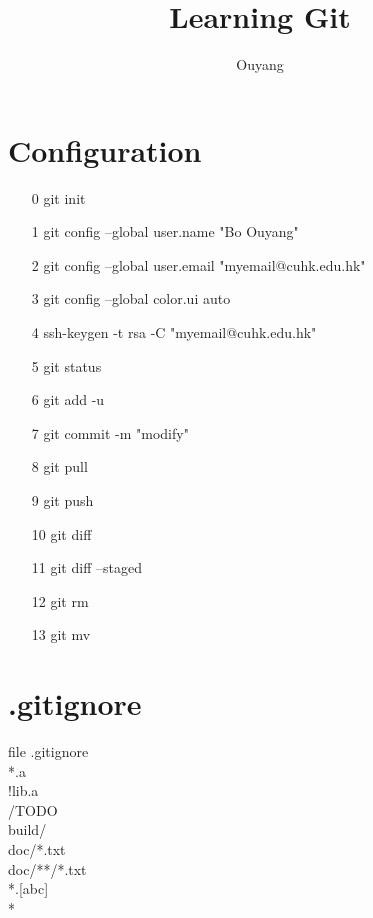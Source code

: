 \documentclass[10pt,a4paper]{article}
\author{Ouyang}
\title{Learning Git}
\begin{document}
	\maketitle
	\section{Configuration}
	\begin{itemize}
		\item[0] git init
		\item[1] git config --global user.name "Bo Ouyang"
		\item[2] git config --global user.email "myemail@cuhk.edu.hk"
		\item[3] git config --global color.ui auto
		\item[4] ssh-keygen -t rsa -C "myemail@cuhk.edu.hk"
		\item[5] git status
		\item[6] git add -u
		\item[7] git commit -m "modify"
		\item[8] git pull
		\item[9] git push
		\item[10] git diff
		\item[11] git diff --staged
		\item[12] git rm
		\item[13] git mv
	\end{itemize}
	\section{.gitignore}
    	file .gitignore\\
		*.a\\
		!lib.a\\
		/TODO\\
		build/\\
		doc/*.txt\\
		doc/**/*.txt\\
		*.[abc]\\
		*~\\
\end{document}
